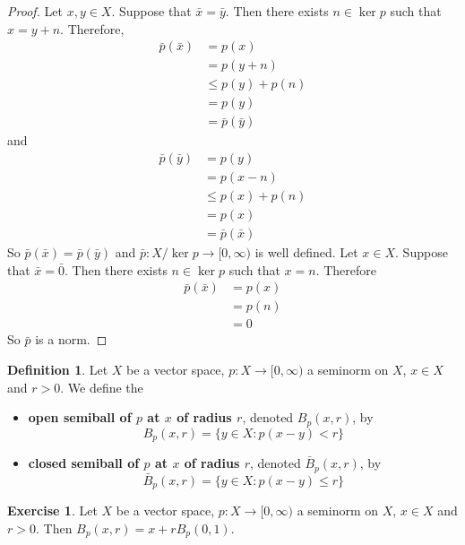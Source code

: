 \documentclass[12pt]{amsart}
\theoremstyle{definition}
\newtheorem{defn}[definition]{Definition}
\newtheorem{ex}[definition]{Exercise}
\newcommand{\Rg}{[0,\infty)}
\begin{document}
	\begin{proof}
		Let $x, y \in X$. Suppose that $\bar{x} = \bar{y}$. Then there exists $n \in \ker p$ such that $x = y + n$. Therefore, 
		\begin{align*}
			\bar{p}(\bar{x}) 
			&= p(x) \\
			&= p(y + n) \\
			&\leq p(y) + p(n) \\
			&= p(y) \\
			&= \bar{p}(\bar{y})
		\end{align*}
		and 
		\begin{align*}
			\bar{p}(\bar{y}) 
			&= p(y) \\
			&= p(x - n) \\
			&\leq p(x) + p(n) \\
			&= p(x) \\
			&= \bar{p}(\bar{x})
		\end{align*}
		So $\bar{p}(\bar{x}) = \bar{p}(\bar{y})$ and $\bar{p}: X / \ker p \rightarrow \Rg$ is well defined. Let $x \in X$. Suppose that $\bar{x} = \bar{0}$. Then there exists $n \in \ker p$ such that $x = n$. Therefore 
		\begin{align*}
			\bar{p}(\bar{x}) 
			&= p(x) \\
			&= p(n) \\
			&= 0
		\end{align*}
		So $\bar{p}$ is a norm.
	\end{proof}

	
	\begin{defn}
		Let $X$ be a vector space, $p:X \rightarrow \Rg$ a seminorm on $X$, $x \in X$ and $r >0$. We define the 
		\begin{itemize}
			\item \textbf{open semiball of $p$ at $x$ of radius $r$}, denoted $B_p(x, r)$, by $$B_p(x, r) = \{y \in X: p(x - y) < r\}$$
			\item \textbf{closed semiball of $p$ at $x$ of radius $r$}, denoted $\bar{B}_p(x, r)$, by $$\bar{B}_p(x, r) = \{y \in X: p(x - y) \leq r\}$$
		\end{itemize}
	\end{defn}

	\begin{ex} 
		Let $X$ be a vector space, $p:X \rightarrow \Rg$ a seminorm on $X$, $x \in X$ and $r >0$. Then $B_p(x, r) =  x + rB_p(0, 1)$. 
	\end{ex}
\end{document}
